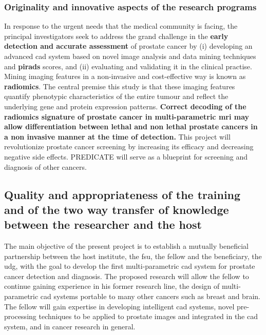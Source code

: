 \subsubsection{Originality and innovative aspects of the research programs}

In response to the urgent needs that the medical community is facing, the principal investigators seek to address the grand challenge in the \textbf{early detection and accurate assessment} of prostate cancer by (i) developing an advanced \ac{cad} system based on novel image analysis and data mining techniques and \textbf{\ac{pirads}} scores, and (ii) evaluating and validating it in the clinical practise. 
Mining imaging features in a non-invasive and cost-effective way is known as \textbf{radiomics}.
The central premise this study is that these imaging features quantify phenotypic characteristics of the entire tumour and reflect the underlying gene and protein expression patterns.
\textbf{Correct decoding of the radiomics signature of prostate cancer in multi-parametric \ac{mri} may allow differentiation between lethal and non lethal prostate cancers in a non invasive manner at the time of detection.}
This project will revolutionize prostate cancer screening by increasing its efficacy and decreasing negative side effects.
PREDICATE will serve as a blueprint for screening and diagnosis of other cancers.

\subsection{Quality and appropriateness of the training and of the two way transfer of knowledge between the researcher and the host}
\label{sec:transfer}

The main objective of the present project is to establish a mutually beneficial partnership between the host institute, the \ac{fsu}, the fellow and the beneficiary, the \ac{udg}, with the goal to develop the first multi-parametric \ac{cad} system for prostate cancer detection and diagnosis.
The proposed research will allow the fellow to continue gaining experience in his former research line, the design of multi-parametric \ac{cad} systems portable to many other cancers such as breast and brain.
The fellow will gain expertise in developing intelligent \ac{cad} systems, novel pre-processing techniques to be applied to prostate images and integrated in the \ac{cad} system, and in cancer research in general.

